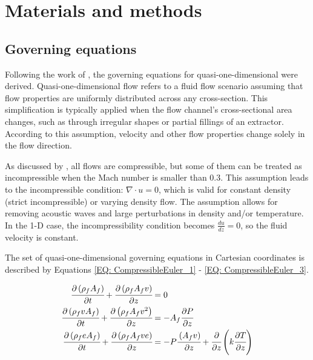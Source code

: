 \documentclass[../Article_Model_Parameters.tex]{subfiles}
\begin{document}
	
	\section{Materials and methods} \label{CH: Materials and methods}
	
	\subsection{Governing equations} \label{CH:Governing_equations_chapter}
	Following the work of \citet{Anderson1995}, the governing equations for quasi-one-dimensional were derived. Quasi-one-dimensional flow refers to a fluid flow scenario assuming that flow properties are uniformly distributed across any cross-section. This simplification is typically applied when the flow channel's cross-sectional area changes, such as through irregular shapes or partial fillings of an extractor. According to this assumption, velocity and other flow properties change solely in the flow direction.
	
	As discussed by \citet{Anderson2023}, all flows are compressible, but some of them can be treated as incompressible when the Mach number is smaller than 0.3. This assumption leads to the incompressible condition: $\nabla \cdot u =0$, which is valid for constant density (strict incompressible) or varying density flow. The assumption allows for removing acoustic waves and large perturbations in density and/or temperature. In the 1-D case, the incompressibility condition becomes $\frac{du}{dz} = 0$, so the fluid velocity is constant.
	
	The set of quasi-one-dimensional governing equations in Cartesian coordinates is described by Equations \ref{EQ: CompressibleEuler_1} - \ref{EQ: CompressibleEuler_3}.
	
	{\footnotesize
		\begin{align}
			\label{EQ: CompressibleEuler_1}
			\cfrac{\partial \left( \rho_f A_f \right) }{\partial t} + \cfrac{\partial \left( \rho_f A_f v \right)}{\partial z} &= 0 \\
			\cfrac{\partial \left( \rho_f v A_f \right) }{\partial t} + \cfrac{\partial \left( \rho_f A_f v^2 \right)}{\partial z} &= -A_f \cfrac{\partial P}{\partial z} \label{EQ: CompressibleEuler_2} \\
			\cfrac{\partial \left( \rho_f e A_f \right) }{\partial t} + \cfrac{\partial \left( \rho_f A_f v e\right)}{\partial z} &= -P\cfrac{\left( A_f v \right)}{\partial z} + \cfrac{\partial}{\partial z} \left( k \cfrac{\partial T}{\partial z} \right)   
			\label{EQ: CompressibleEuler_3}
		\end{align}  
	}
	
\end{document}

